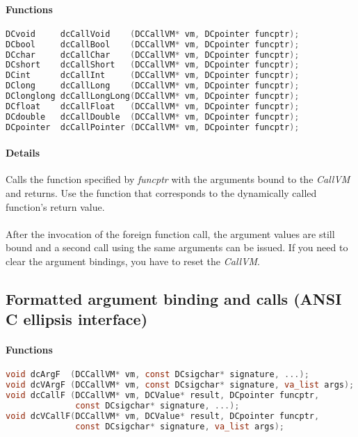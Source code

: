 \paragraph{Functions}

\begin{lstlisting}[language=c]
DCvoid     dcCallVoid    (DCCallVM* vm, DCpointer funcptr);
DCbool     dcCallBool    (DCCallVM* vm, DCpointer funcptr);
DCchar     dcCallChar    (DCCallVM* vm, DCpointer funcptr);
DCshort    dcCallShort   (DCCallVM* vm, DCpointer funcptr);
DCint      dcCallInt     (DCCallVM* vm, DCpointer funcptr);
DClong     dcCallLong    (DCCallVM* vm, DCpointer funcptr);
DClonglong dcCallLongLong(DCCallVM* vm, DCpointer funcptr);
DCfloat    dcCallFloat   (DCCallVM* vm, DCpointer funcptr);
DCdouble   dcCallDouble  (DCCallVM* vm, DCpointer funcptr);
DCpointer  dcCallPointer (DCCallVM* vm, DCpointer funcptr);
\end{lstlisting}

\paragraph{Details}
Calls the function specified by \emph{funcptr} with the arguments bound to
the \emph{CallVM} and returns. Use the function that corresponds to the
dynamically called function's return value.\\
\\
After the invocation of the foreign function call, the argument values are
still bound and a second call using the same arguments can be issued. If you
need to clear the argument bindings, you have to reset the \emph{CallVM}.

\subsection{Formatted argument binding and calls (ANSI C ellipsis interface)}

\paragraph{Functions}

\begin{lstlisting}[language=c]
void dcArgF  (DCCallVM* vm, const DCsigchar* signature, ...);
void dcVArgF (DCCallVM* vm, const DCsigchar* signature, va_list args);
void dcCallF (DCCallVM* vm, DCValue* result, DCpointer funcptr, 
              const DCsigchar* signature, ...);
void dcVCallF(DCCallVM* vm, DCValue* result, DCpointer funcptr, 
              const DCsigchar* signature, va_list args);
\end{lstlisting}

